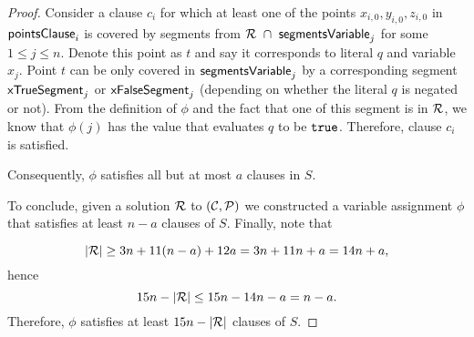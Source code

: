 \begin{proof}
Consider a clause $c_i$ for which at least one of the points
$x_{i,0}, y_{i,0}, z_{i,0}$ in $\mathsf{pointsClause}_{i}$ is covered by
segments from $\mathcal{R}~\cap~\mathsf{segmentsVariable}_{j}$ for some $1 \le j \le n$.
Denote this point as $t$ and say it corresponds to
literal $q$ and variable $x_j$.
Point $t$ can be only covered in $\mathsf{segmentsVariable}_{j}$
by a corresponding segment $\mathsf{xTrueSegment}_{j}$ or $\mathsf{xFalseSegment}_{j}$
(depending on whether the literal $q$ is negated or not).
From the definition of $\phi$ and the fact that one of this segment is
in $\mathcal{R}$, we know that
$\phi(j)$ has the value that evaluates $q$ to be $\texttt{true}$.
Therefore, clause $c_i$ is satisfied.

Consequently, $\phi$ satisfies all but at most $a$ clauses in $S$.

To conclude,
given a solution $\mathcal{R}$ to $(\mathcal{C}, \mathcal{P})$ we constructed
a variable assignment $\phi$
that satisfies at least $n-a$ clauses of $S$.
Finally, note that

$$|\mathcal{R}| \ge 3n + 11(n-a) + 12a = 3n + 11n + a = 14n + a,$$
hence
$$15n - |\mathcal{R}|  \le 15n - 14n - a = n - a.$$
Therefore, $\phi$ satisfies at least $15n-|\mathcal{R}|$ clauses of $S$.
\end{proof}
